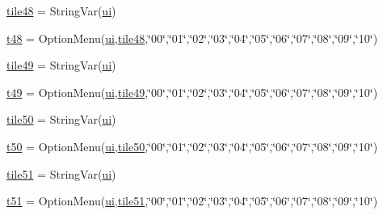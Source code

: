 \begin{DoxyCompactItemize}
\item 
\mbox{\hyperlink{namespacegui_a174b37164c4494cb221388aa7ceb65bc}{tile48}} = String\+Var(\mbox{\hyperlink{namespacegui_a40ab7281456eadbea2dc2038f5c24fa1}{ui}})
\item 
\mbox{\hyperlink{namespacegui_a393fdf7dceba469ee5cd447f5ec47689}{t48}} = Option\+Menu(\mbox{\hyperlink{namespacegui_a40ab7281456eadbea2dc2038f5c24fa1}{ui}},\mbox{\hyperlink{namespacegui_a174b37164c4494cb221388aa7ceb65bc}{tile48}},\char`\"{}00\char`\"{},\char`\"{}01\char`\"{},\char`\"{}02\char`\"{},\char`\"{}03\char`\"{},\char`\"{}04\char`\"{},\char`\"{}05\char`\"{},\char`\"{}06\char`\"{},\char`\"{}07\char`\"{},\char`\"{}08\char`\"{},\char`\"{}09\char`\"{},\char`\"{}10\char`\"{})
\item 
\mbox{\hyperlink{namespacegui_a59285f7ea83c2953e86335c182b23524}{tile49}} = String\+Var(\mbox{\hyperlink{namespacegui_a40ab7281456eadbea2dc2038f5c24fa1}{ui}})
\item 
\mbox{\hyperlink{namespacegui_a8662e7d514c7809efa91cc618502f069}{t49}} = Option\+Menu(\mbox{\hyperlink{namespacegui_a40ab7281456eadbea2dc2038f5c24fa1}{ui}},\mbox{\hyperlink{namespacegui_a59285f7ea83c2953e86335c182b23524}{tile49}},\char`\"{}00\char`\"{},\char`\"{}01\char`\"{},\char`\"{}02\char`\"{},\char`\"{}03\char`\"{},\char`\"{}04\char`\"{},\char`\"{}05\char`\"{},\char`\"{}06\char`\"{},\char`\"{}07\char`\"{},\char`\"{}08\char`\"{},\char`\"{}09\char`\"{},\char`\"{}10\char`\"{})
\item 
\mbox{\hyperlink{namespacegui_aaaa7bd00c74fe95ffd396a2280fe1bcd}{tile50}} = String\+Var(\mbox{\hyperlink{namespacegui_a40ab7281456eadbea2dc2038f5c24fa1}{ui}})
\item 
\mbox{\hyperlink{namespacegui_a361e7bafb1cca2723c0d9006df7f314c}{t50}} = Option\+Menu(\mbox{\hyperlink{namespacegui_a40ab7281456eadbea2dc2038f5c24fa1}{ui}},\mbox{\hyperlink{namespacegui_aaaa7bd00c74fe95ffd396a2280fe1bcd}{tile50}},\char`\"{}00\char`\"{},\char`\"{}01\char`\"{},\char`\"{}02\char`\"{},\char`\"{}03\char`\"{},\char`\"{}04\char`\"{},\char`\"{}05\char`\"{},\char`\"{}06\char`\"{},\char`\"{}07\char`\"{},\char`\"{}08\char`\"{},\char`\"{}09\char`\"{},\char`\"{}10\char`\"{})
\item 
\mbox{\hyperlink{namespacegui_ad2c1b5064cba842f7abd0322229ca355}{tile51}} = String\+Var(\mbox{\hyperlink{namespacegui_a40ab7281456eadbea2dc2038f5c24fa1}{ui}})
\item 
\mbox{\hyperlink{namespacegui_a8e94b651f603f64070b4f7fd8dedb0c7}{t51}} = Option\+Menu(\mbox{\hyperlink{namespacegui_a40ab7281456eadbea2dc2038f5c24fa1}{ui}},\mbox{\hyperlink{namespacegui_ad2c1b5064cba842f7abd0322229ca355}{tile51}},\char`\"{}00\char`\"{},\char`\"{}01\char`\"{},\char`\"{}02\char`\"{},\char`\"{}03\char`\"{},\char`\"{}04\char`\"{},\char`\"{}05\char`\"{},\char`\"{}06\char`\"{},\char`\"{}07\char`\"{},\char`\"{}08\char`\"{},\char`\"{}09\char`\"{},\char`\"{}10\char`\"{})

\end{DoxyCompactItemize}
